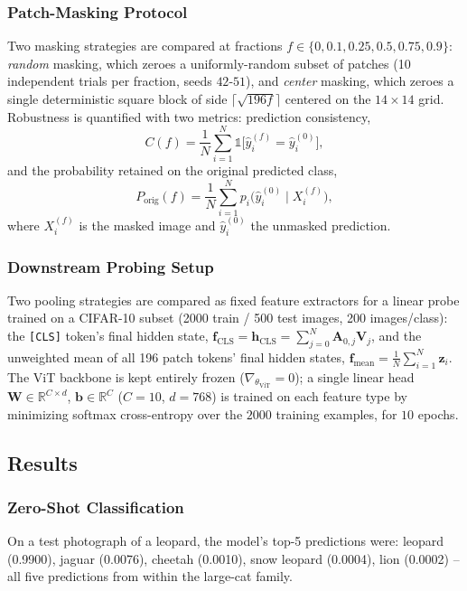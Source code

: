 \subsubsection{Patch-Masking Protocol}

Two masking strategies are compared at fractions
$f\in\{0,0.1,0.25,0.5,0.75,0.9\}$: \emph{random} masking, which zeroes a
uniformly-random subset of patches (10 independent trials per fraction,
seeds $42$-$51$), and \emph{center} masking, which zeroes a single
deterministic square block of side
$\lceil\sqrt{196f}\rceil$ centered on the $14\times14$ grid. Robustness is
quantified with two metrics: prediction consistency,
\[
  C(f) = \frac{1}{N}\sum_{i=1}^N \mathbb{1}\big[\hat y_i^{(f)} = \hat y_i^{(0)}\big],
\]
and the probability retained on the original predicted class,
\[
  P_{\text{orig}}(f) = \frac{1}{N}\sum_{i=1}^N p_i\big(\hat y_i^{(0)} \mid X_i^{(f)}\big),
\]
where $X_i^{(f)}$ is the masked image and $\hat y_i^{(0)}$ the unmasked
prediction.

\subsubsection{Downstream Probing Setup}

Two pooling strategies are compared as fixed feature extractors for a
linear probe trained on a CIFAR-10 subset (2000 train / 500 test images,
200 images/class): the \texttt{[CLS]} token's final hidden state,
$\mathbf{f}_{\text{CLS}}=\mathbf{h}_{\text{CLS}}=\sum_{j=0}^{N}\mathbf{A}_{0,j}\mathbf{V}_j$,
and the unweighted mean of all 196 patch tokens' final hidden states,
$\mathbf{f}_{\text{mean}}=\frac{1}{N}\sum_{i=1}^{N}\mathbf{z}_i$. The ViT
backbone is kept entirely frozen ($\nabla_{\theta_{\text{ViT}}}=0$); a
single linear head $\mathbf{W}\in\mathbb{R}^{C\times d}$,
$\mathbf{b}\in\mathbb{R}^C$ ($C=10$, $d=768$) is trained on each feature
type by minimizing softmax cross-entropy over the $2000$ training
examples, for $10$ epochs.

\subsection{Results}

\subsubsection{Zero-Shot Classification}

On a test photograph of a leopard, the model's top-5 predictions were:
leopard (0.9900), jaguar (0.0076), cheetah (0.0010), snow leopard (0.0004),
lion (0.0002) -- all five predictions from within the large-cat family.

